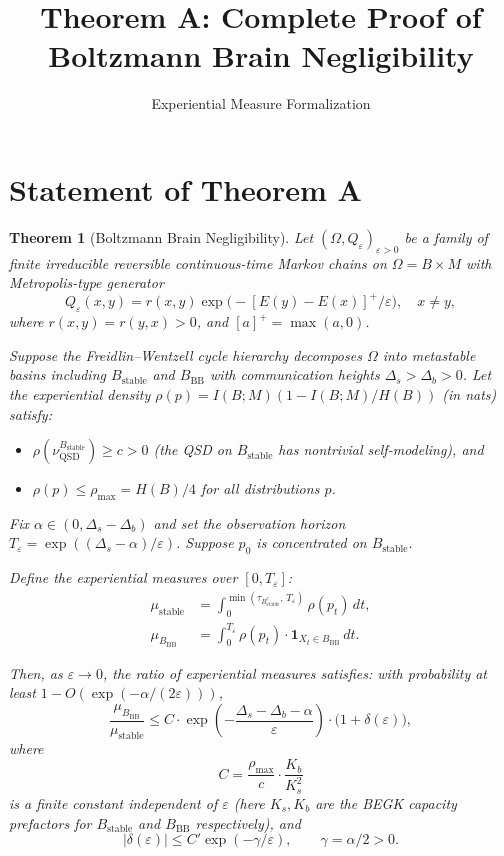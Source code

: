 \documentclass[11pt]{article}
\title{Theorem A: Complete Proof of Boltzmann Brain Negligibility}
\author{Experiential Measure Formalization}
\date{}
\newtheorem{theorem}{Theorem}
\newcommand{\eps}{\varepsilon}
\newcommand{\Ds}{\Delta_s}
\newcommand{\Db}{\Delta_b}
\newcommand{\Bstable}{B_{\mathrm{stable}}}
\newcommand{\BBB}{B_{\mathrm{BB}}}
\newcommand{\Teps}{T_\eps}
\newcommand{\QSD}{\mathrm{QSD}}
\begin{document}
\maketitle

\section{Statement of Theorem A}

\begin{theorem}[Boltzmann Brain Negligibility]\label{thm:A}
Let $(\Omega, Q_\eps)_{\eps > 0}$ be a family of finite irreducible
reversible continuous-time Markov chains on $\Omega = B \times M$ with
Metropolis-type generator
\[
  Q_\eps(x,y) = r(x,y)\exp\!\bigl(-[E(y)-E(x)]^+/\eps\bigr),
  \quad x \neq y,
\]
where $r(x,y) = r(y,x) > 0$, and $[a]^+ = \max(a,0)$.

Suppose the Freidlin--Wentzell cycle hierarchy decomposes $\Omega$ into
metastable basins including $\Bstable$ and $\BBB$ with communication
heights $\Ds > \Db > 0$. Let the experiential density
$\rho(p) = I(B;M)(1 - I(B;M)/H(B))$ (in nats) satisfy:
\begin{itemize}
\item $\rho(\nu_\QSD^{\Bstable}) \geq c > 0$
  (the QSD on $\Bstable$ has nontrivial self-modeling), and
\item $\rho(p) \leq \rho_{\max} = H(B)/4$ for all distributions $p$.
\end{itemize}

Fix $\alpha \in (0, \Ds - \Db)$ and set the observation horizon
$\Teps = \exp((\Ds - \alpha)/\eps)$. Suppose $p_0$ is concentrated
on $\Bstable$.

Define the experiential measures over $[0, \Teps]$:
\begin{align}
  \mu_{\mathrm{stable}}
  &= \int_0^{\min(\tau_{\Bstable^c},\, \Teps)}
    \rho(p_t)\, dt,
    \label{eq:mu-stable-def} \\
  \mu_\BBB
  &= \int_0^{\Teps} \rho(p_t) \cdot
    \mathbf{1}_{X_t \in \BBB}\, dt.
    \label{eq:mu-bb-def}
\end{align}

Then, as $\eps \to 0$, the ratio of experiential measures satisfies:
with probability at least $1 - O(\exp(-\alpha/(2\eps)))$,
\begin{equation}\label{eq:theorem-a}
  \frac{\mu_\BBB}{\mu_{\mathrm{stable}}}
  \leq C \cdot \exp\!\left(
    -\frac{\Ds - \Db - \alpha}{\eps}
  \right)
  \cdot \bigl(1 + \delta(\eps)\bigr),
\end{equation}
where
\begin{equation}\label{eq:C-def}
  C = \frac{\rho_{\max}}{c} \cdot \frac{K_b}{K_s^2}
\end{equation}
is a finite constant independent of $\eps$ (here $K_s, K_b$ are
the BEGK capacity prefactors for $\Bstable$ and $\BBB$ respectively),
and
\begin{equation}\label{eq:delta-def}
  |\delta(\eps)| \leq C' \exp(-\gamma/\eps),
  \qquad \gamma = \alpha/2 > 0.
\end{equation}


\end{theorem}
\end{document}
